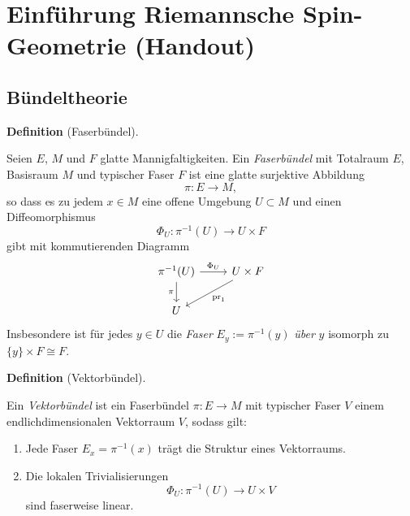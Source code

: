 \documentclass[10pt, letterpaper]{article}
\newcommand{\CustomHeading}[3]{%
  \par\medskip\noindent%
  \textbf{#1 #2} \textnormal{(#3)}.\enskip%
}
\newenvironment{DEF}[2]{\CustomHeading{Definition}{#1}{#2}}{}
\begin{document}
\section{Einführung Riemannsche Spin-Geometrie (Handout)}

\subsection{Bündeltheorie}

\begin{DEF}{}{Faserbündel}
Seien $E$, $M$ und $F$ glatte Mannigfaltigkeiten. Ein \emph{Faserbündel} mit Totalraum $E$, Basisraum $M$ und typischer Faser $F$
ist eine glatte surjektive Abbildung
\[
\pi:E\to M,
\]
so dass es zu jedem $x\in M$ eine offene Umgebung $U\subset M$ und einen Diffeomorphismus
\[
\Phi_U:\pi^{-1}(U)\to U\times F
\]
gibt mit kommutierenden Diagramm
\[
\begin{tikzcd}
\pi^{-1}(U) \arrow[r,"\Phi_U"] \arrow[d,"\pi"'] & U\times F \arrow[dl,"\operatorname{pr}_1"] \\
U &
\end{tikzcd}
\]
Insbesondere ist für jedes $y\in U$ die \emph{Faser} $E_y:=\pi^{-1}(y)$ \emph{über} $y$ isomorph zu $\{y\}\times F\cong F$.
\end{DEF}

\begin{DEF}{}{Vektorbündel}
Ein \emph{Vektorbündel} ist ein Faserbündel $\pi:E\to M$ mit typischer Faser $V$ einem endlichdimensionalen Vektorraum $V$, sodass gilt:
\begin{enumerate}
  \item Jede Faser $E_x=\pi^{-1}(x)$ trägt die Struktur eines Vektorraums.
  \item Die lokalen Trivialisierungen
        \[
        \Phi_U:\pi^{-1}(U)\to U\times V
        \]
        sind faserweise linear.
\end{enumerate}
\end{DEF}
\end{document}
